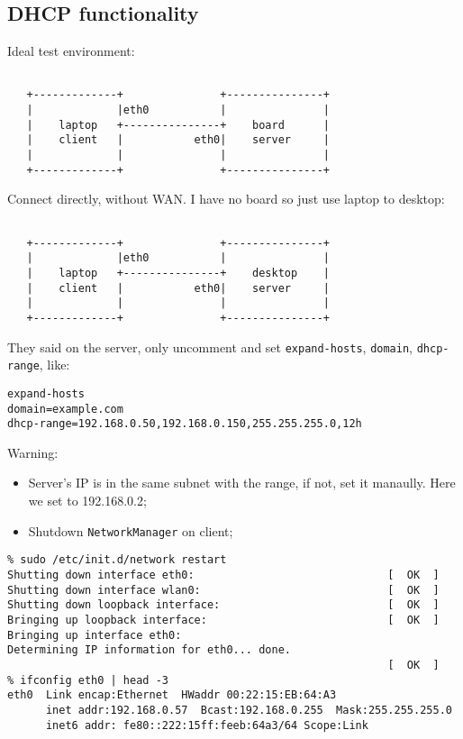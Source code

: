 \documentclass[a4paper]{report}
\begin{document}
\subsection{DHCP functionality}
Ideal test environment:
\begin{lstlisting}
                                                  
   +-------------+               +---------------+
   |             |eth0           |               |
   |    laptop   +---------------+    board      |
   |    client   |           eth0|    server     |
   |             |               |               |
   +-------------+               +---------------+

\end{lstlisting}
Connect directly, without WAN. I have no board so just use laptop to desktop:
\begin{lstlisting}
                                                  
   +-------------+               +---------------+
   |             |eth0           |               |
   |    laptop   +---------------+    desktop    |
   |    client   |           eth0|    server     |
   |             |               |               |
   +-------------+               +---------------+

\end{lstlisting}
They said on the server, only uncomment and set {\tt expand-hosts}, {\tt domain},
{\tt dhcp-range}, like:
\begin{lstlisting}
expand-hosts
domain=example.com
dhcp-range=192.168.0.50,192.168.0.150,255.255.255.0,12h
\end{lstlisting}
Warning:
\begin{itemize}
    \item Server's IP is in the same subnet with the range, if not, set it manaully.
          Here we set to 192.168.0.2;
    \item Shutdown {\tt NetworkManager} on client;
\end{itemize}
\begin{lstlisting}
% sudo /etc/init.d/network restart
Shutting down interface eth0:                              [  OK  ]
Shutting down interface wlan0:                             [  OK  ]
Shutting down loopback interface:                          [  OK  ]
Bringing up loopback interface:                            [  OK  ]
Bringing up interface eth0:  
Determining IP information for eth0... done.
                                                           [  OK  ]
% ifconfig eth0 | head -3
eth0  Link encap:Ethernet  HWaddr 00:22:15:EB:64:A3  
      inet addr:192.168.0.57  Bcast:192.168.0.255  Mask:255.255.255.0
      inet6 addr: fe80::222:15ff:feeb:64a3/64 Scope:Link
\end{lstlisting}
\end{document}
